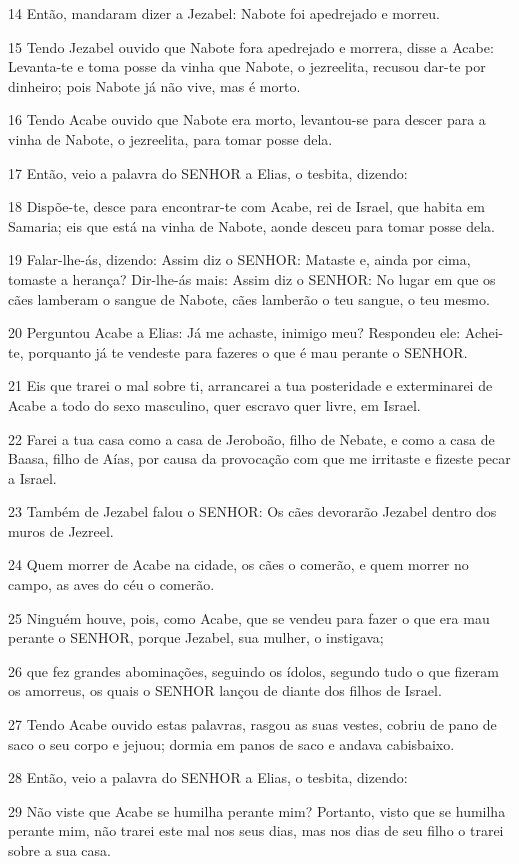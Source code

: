 \par 14 Então, mandaram dizer a Jezabel: Nabote foi apedrejado e morreu.
\par 15 Tendo Jezabel ouvido que Nabote fora apedrejado e morrera, disse a Acabe: Levanta-te e toma posse da vinha que Nabote, o jezreelita, recusou dar-te por dinheiro; pois Nabote já não vive, mas é morto.
\par 16 Tendo Acabe ouvido que Nabote era morto, levantou-se para descer para a vinha de Nabote, o jezreelita, para tomar posse dela.
\par 17 Então, veio a palavra do SENHOR a Elias, o tesbita, dizendo:
\par 18 Dispõe-te, desce para encontrar-te com Acabe, rei de Israel, que habita em Samaria; eis que está na vinha de Nabote, aonde desceu para tomar posse dela.
\par 19 Falar-lhe-ás, dizendo: Assim diz o SENHOR: Mataste e, ainda por cima, tomaste a herança? Dir-lhe-ás mais: Assim diz o SENHOR: No lugar em que os cães lamberam o sangue de Nabote, cães lamberão o teu sangue, o teu mesmo.
\par 20 Perguntou Acabe a Elias: Já me achaste, inimigo meu? Respondeu ele: Achei-te, porquanto já te vendeste para fazeres o que é mau perante o SENHOR.
\par 21 Eis que trarei o mal sobre ti, arrancarei a tua posteridade e exterminarei de Acabe a todo do sexo masculino, quer escravo quer livre, em Israel.
\par 22 Farei a tua casa como a casa de Jeroboão, filho de Nebate, e como a casa de Baasa, filho de Aías, por causa da provocação com que me irritaste e fizeste pecar a Israel.
\par 23 Também de Jezabel falou o SENHOR: Os cães devorarão Jezabel dentro dos muros de Jezreel.
\par 24 Quem morrer de Acabe na cidade, os cães o comerão, e quem morrer no campo, as aves do céu o comerão.
\par 25 Ninguém houve, pois, como Acabe, que se vendeu para fazer o que era mau perante o SENHOR, porque Jezabel, sua mulher, o instigava;
\par 26 que fez grandes abominações, seguindo os ídolos, segundo tudo o que fizeram os amorreus, os quais o SENHOR lançou de diante dos filhos de Israel.
\par 27 Tendo Acabe ouvido estas palavras, rasgou as suas vestes, cobriu de pano de saco o seu corpo e jejuou; dormia em panos de saco e andava cabisbaixo.
\par 28 Então, veio a palavra do SENHOR a Elias, o tesbita, dizendo:
\par 29 Não viste que Acabe se humilha perante mim? Portanto, visto que se humilha perante mim, não trarei este mal nos seus dias, mas nos dias de seu filho o trarei sobre a sua casa.

